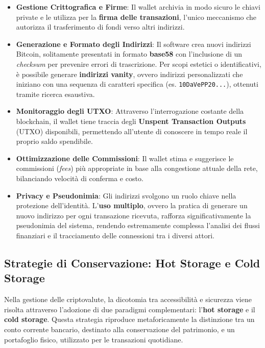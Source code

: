\begin{itemize}
    \item \textbf{Gestione Crittografica e Firme}: Il wallet archivia in modo sicuro le chiavi private e le utilizza per la \textbf{firma delle transazioni}, l'unico meccanismo che autorizza il trasferimento di fondi verso altri indirizzi.
    \item \textbf{Generazione e Formato degli Indirizzi}: Il software crea nuovi indirizzi Bitcoin, solitamente presentati in formato \textbf{base58} con l'inclusione di un \textit{checksum} per prevenire errori di trascrizione. Per scopi estetici o identificativi, è possibile generare \textbf{indirizzi vanity}, ovvero indirizzi personalizzati che iniziano con una sequenza di caratteri specifica (es. \texttt{10DaVePP20...}), ottenuti tramite ricerca esaustiva.
    \item \textbf{Monitoraggio degli UTXO}: Attraverso l'interrogazione costante della blockchain, il wallet tiene traccia degli \textbf{Unspent Transaction Outputs} (UTXO) disponibili, permettendo all'utente di conoscere in tempo reale il proprio saldo spendibile.
    \item \textbf{Ottimizzazione delle Commissioni}: Il wallet stima e suggerisce le commissioni (\textit{fees}) più appropriate in base alla congestione attuale della rete, bilanciando velocità di conferma e costo.
    \item \textbf{Privacy e Pseudonimia}: Gli indirizzi svolgono un ruolo chiave nella protezione dell'identità. L'\textbf{uso multiplo}, ovvero la pratica di generare un nuovo indirizzo per ogni transazione ricevuta, rafforza significativamente la pseudonimia del sistema, rendendo estremamente complessa l'analisi dei flussi finanziari e il tracciamento delle connessioni tra i diversi attori.
\end{itemize}
\subsection{Strategie di Conservazione: Hot Storage e Cold Storage}

Nella gestione delle criptovalute, la dicotomia tra accessibilità e sicurezza viene risolta attraverso l'adozione di due paradigmi complementari: l'\textbf{hot storage} e il \textbf{cold storage}. Questa strategia riproduce metaforicamente la distinzione tra un conto corrente bancario, destinato alla conservazione del patrimonio, e un portafoglio fisico, utilizzato per le transazioni quotidiane.

